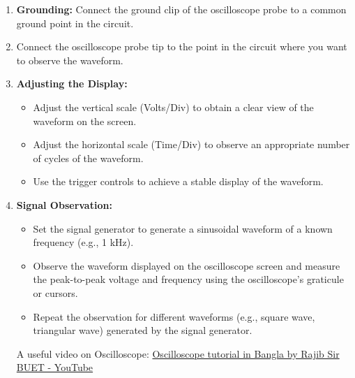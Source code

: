 \begin{enumerate}
    \item \textbf{Grounding:} Connect the ground clip of the oscilloscope probe to a common ground point in the circuit.

    \item Connect the oscilloscope probe tip to the point in the circuit where you want to observe the waveform.

    \item \textbf{Adjusting the Display:}
    
    \begin{itemize}
    
        \item Adjust the vertical scale (Volts/Div) to obtain a clear view of the waveform on the screen.

        \item Adjust the horizontal scale (Time/Div) to observe an appropriate number of cycles of the waveform.

        \item Use the trigger controls to achieve a stable display of the waveform.
        
    \end{itemize}

    \item \textbf{Signal Observation:}

    \begin{itemize}
    
        \item Set the signal generator to generate a sinusoidal waveform of a known frequency (e.g., 1 kHz).

        \item Observe the waveform displayed on the oscilloscope screen and measure the peak-to-peak voltage and frequency using the oscilloscope's graticule or cursors.

        \item Repeat the observation for different waveforms (e.g., square wave, triangular wave) generated by the signal generator.
        
    \end{itemize}

\color{red} A useful video on Oscilloscope: \href{https://www.youtube.com/watch?v=-qwzybAtvng}{Oscilloscope tutorial in Bangla by Rajib Sir BUET - YouTube}

\end{enumerate}

